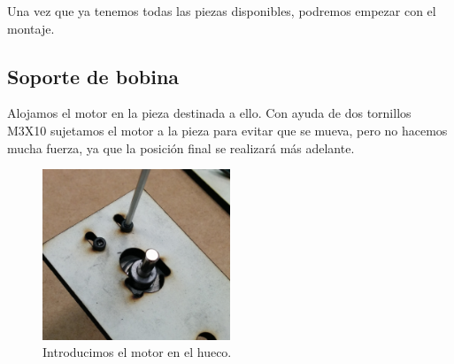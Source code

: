  Una vez que ya tenemos todas las piezas disponibles, podremos empezar con el montaje.
 \subsection{Soporte de bobina}

Alojamos el motor en la pieza destinada a ello. Con ayuda de dos tornillos M3X10 sujetamos el motor a la pieza para evitar que se mueva, pero no hacemos mucha fuerza, ya que la posición final se realizará más adelante.

    \begin{figure}[H]
            \centering
            \includegraphics[width=0.5\textwidth]{images/filawinder/montaje1.png}
            \caption{Introducimos el motor en el hueco.}
            \label{fig:winder_piezas}
    \end{figure}

